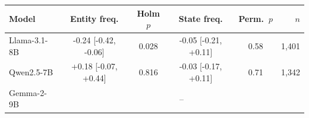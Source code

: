 \begin{tabular}{lccccr}
\toprule
Model & Entity freq. & Holm $p$ & State freq. & Perm.\ $p$ & $n$ \\
\midrule
Llama-3.1-8B & -0.24 [-0.42{,} -0.06] & 0.028 & -0.05 [-0.21{,} +0.11] & 0.58 & 1{,}401 \\
Qwen2.5-7B & +0.18 [-0.07{,} +0.44] & 0.816 & -0.03 [-0.17{,} +0.11] & 0.71 & 1{,}342 \\
Gemma-2-9B & \multicolumn{5}{c}{--} \\
\bottomrule
\end{tabular}
